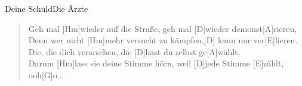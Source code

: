 \begin{song}{Deine Schuld}{Die Ärzte}

    \begin{verse}
        Geh mal [Hm]wieder auf die Straße, geh mal [D]wieder demonst[A]rieren,\\
        Denn wer nicht [Hm]mehr versucht zu kämpfen,[D] kann nur ver[E]lieren.\\
        [Hm]Die, die dich verarschen, die [D]hast du selbst ge[A]wählt,\\
        Darum [Hm]lass sie deine Stimme hörn, weil [D]jede Stimme [E]zählt, ooh[G]o...
    \end{verse}


\end{song}
